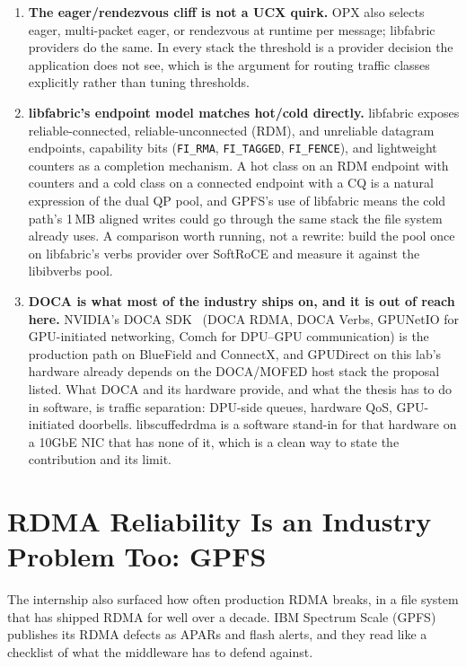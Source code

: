 \documentclass[11pt,letterpaper]{article}
\begin{document}
\begin{enumerate}
\item \textbf{The eager/rendezvous cliff is not a UCX quirk.} OPX also selects eager, multi-packet eager, or rendezvous at runtime per message; libfabric providers do the same. In every stack the threshold is a provider decision the application does not see, which is the argument for routing traffic classes explicitly rather than tuning thresholds.
\item \textbf{libfabric's endpoint model matches hot/cold directly.} libfabric exposes reliable-connected, reliable-unconnected (RDM), and unreliable datagram endpoints, capability bits (\texttt{FI\_RMA}, \texttt{FI\_TAGGED}, \texttt{FI\_FENCE}), and lightweight counters as a completion mechanism. A hot class on an RDM endpoint with counters and a cold class on a connected endpoint with a CQ is a natural expression of the dual QP pool, and GPFS's use of libfabric means the cold path's 1\,MB aligned writes could go through the same stack the file system already uses. A comparison worth running, not a rewrite: build the pool once on libfabric's verbs provider over SoftRoCE and measure it against the libibverbs pool.
\item \textbf{DOCA is what most of the industry ships on, and it is out of reach here.} NVIDIA's DOCA SDK~\cite{doca} (DOCA RDMA, DOCA Verbs, GPUNetIO for GPU-initiated networking, Comch for DPU--GPU communication) is the production path on BlueField and ConnectX, and GPUDirect on this lab's hardware already depends on the DOCA/MOFED host stack the proposal listed. What DOCA and its hardware provide, and what the thesis has to do in software, is traffic separation: DPU-side queues, hardware QoS, GPU-initiated doorbells. libscuffedrdma is a software stand-in for that hardware on a 10GbE NIC that has none of it, which is a clean way to state the contribution and its limit.
\end{enumerate}

\section{RDMA Reliability Is an Industry Problem Too: GPFS}

The internship also surfaced how often production RDMA breaks, in a file system that has shipped RDMA for well over a decade. IBM Spectrum Scale (GPFS) publishes its RDMA defects as APARs and flash alerts, and they read like a checklist of what the middleware has to defend against.
\end{document}
